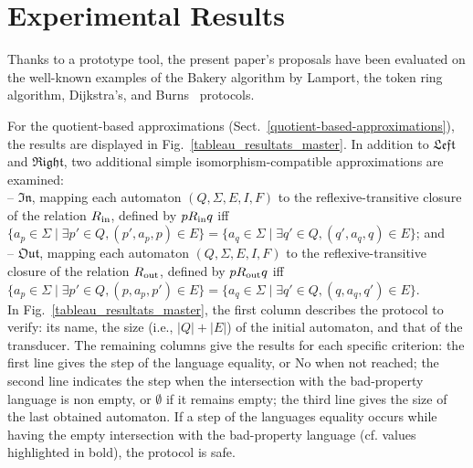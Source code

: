 \documentclass[]{llncs}
\begin{document}
\section{Experimental Results}\label{sec:experimentations}

Thanks to a prototype tool, the present paper's proposals have been evaluated on the
well-known examples of the
Bakery algorithm by Lamport, the token ring algorithm, Dijkstra's, and
Burns~\cite{touili_regular_2001} protocols.



For the quotient-based approximations
(Sect.~\ref{quotient-based-approximations}), the results are displayed in
Fig.~\ref{tableau_resultats_master}. 
In addition to $\mathfrak{Left}$ and $\mathfrak{Right}$, 
two additional simple isomorphism-compatible approximations are examined: \\
\noindent -- $\mathfrak{In}$, mapping each automaton $(Q,\Sigma,E,I,F)$ to the
   reflexive-transitive closure of the relation $R_{\rm in}$, defined by $p R_{\rm in} q$ iff
 $\lbrace a_p \in \Sigma \mid \exists p' \in Q, (p',a_p,p) \in E \rbrace = \lbrace a_q \in \Sigma \mid \exists q' \in Q, (q',a_q,q) \in E \rbrace$; and \\
\noindent -- $\mathfrak{Out}$, mapping each automaton $(Q,\Sigma,E,I,F)$ to the
   reflexive-transitive closure of the relation $R_{\rm out}$, defined by $p R_{\rm out} q$ iff
 $\lbrace a_p \in \Sigma \mid \exists p' \in Q, (p,a_p,p') \in E \rbrace = \lbrace a_q \in \Sigma \mid \exists q' \in Q, (q,a_q,q') \in E \rbrace$.\\
In Fig.~\ref{tableau_resultats_master}, the first column describes
 the protocol to verify: its name, the size (i.e., $|Q|+|E|$) of the
 initial automaton, and that of the transducer. The remaining columns give the results for each specific criterion:
the first line gives the step of the language equality, or No when not reached;
the second line indicates the step when the intersection with the bad-property language is non empty, or $\emptyset$ if it remains empty;
the third line gives the size of the last obtained automaton.
If a step of the languages equality occurs while having the empty intersection with the bad-property language (cf. values highlighted in bold), the protocol is safe.
\end{document}
